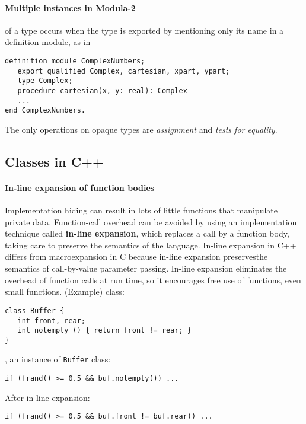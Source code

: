 \documentclass{article}
\begin{document}
\paragraph{Multiple instances in Modula-2}
\bit
{} of a type occurs when the type is exported by 
	mentioning only its name in a definition module, as in
	\begin{verbatim}
definition module ComplexNumbers;
   export qualified Complex, cartesian, xpart, ypart;
   type Complex;
   procedure cartesian(x, y: real): Complex
   ...
end ComplexNumbers.
	\end{verbatim}
	\bit
	\w The only operations on opaque types are {\em{}assignment\/}
		and {\em{}tests for equality\/}.
	\eit
\eit

\subsection{Classes in C++}
\paragraph{In-line expansion of function bodies}
\bit
\w Implementation hiding can result in lots of little functions that
	manipulate private data. 
	\bit
	\w Function-call overhead can be avoided by using an implementation
		technique called {\bf{}in-line expansion}, which replaces
		a call by a function body, taking care to preserve the
		semantics of the language.
	\w In-line expansion in C++ differs from macroexpansion in C
		because in-line expansion preservesthe semantics of
		call-by-value parameter passing.
	\w In-line expansion eliminates the overhead of function calls 
		at run time,
		so it encourages free use of functions, 
		even small functions.
	\eit
\w (Example)
	\bit
	 class:
	\begin{verbatim}
class Buffer {
   int front, rear;
   int notempty () { return front != rear; }
}
	\end{verbatim}
	, an instance of {\tt{}Buffer} class:
	\begin{verbatim}
if (frand() >= 0.5 && buf.notempty()) ...
	\end{verbatim}
	\w After in-line expansion:
\begin{verbatim}
if (frand() >= 0.5 && buf.front != buf.rear)) ...
\end{verbatim}

	\eit
\eit
\end{document}
